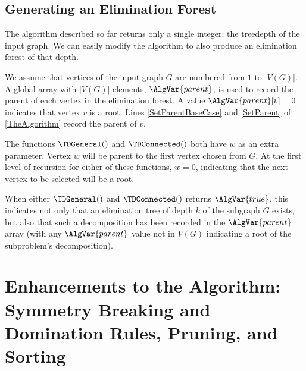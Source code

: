 {    %

    \subsection{Generating an Elimination Forest}\label{sec:generating}

    The algorithm described so far returns only a single integer: the treedepth of the input graph.
    We can easily modify the algorithm to also produce an elimination forest of that depth.

    We assume that vertices of the input graph $G$ are numbered from $1$ to $|V(G)|$. A global array
    with $|V(G)|$ elements, $\AlgVar{parent}$, is used to record the parent of each vertex
    in the elimination forest.  A value $\AlgVar{parent}[v] = 0$ indicates that vertex $v$ is a root.
    Lines \ref{SetParentBaseCase} and \ref{SetParent} of \cref{TheAlgorithm} record the parent of $v$.

    The functions $\TDGeneral()$ and $\TDConnected()$ both have $w$ as an extra parameter.
    Vertex $w$ will be parent to the first vertex chosen from $G$.  At the first level
    of recursion for either of these functions, $w=0$, indicating that the next vertex to be selected will be
    a root.

    When either $\TDGeneral()$ and $\TDConnected()$ returns $\AlgVar{true}$, this indicates
    not only that an elimination tree of depth $k$ of the subgraph $G$ exists, but also that such
    a decomposition has been recorded in the $\AlgVar{parent}$ array (with any $\AlgVar{parent}$ value
    not in $V(G)$ indicating a root of the subproblem's decomposition).

    \section{Enhancements to the Algorithm: Symmetry Breaking and Domination Rules, Pruning, and Sorting}\label{sec:extrafeatures}

}

